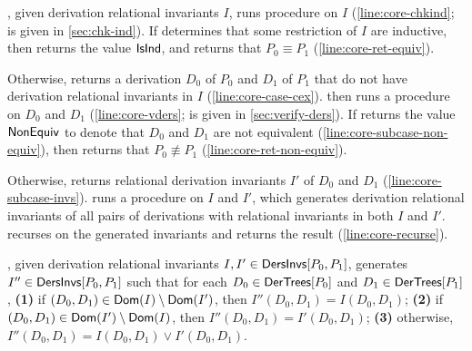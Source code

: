 \verifyaux, given derivation relational invariants $I$, runs procedure
\chkinductive on $I$ (\autoref{line:core-chkind}; 
%
\chkinductive is given in \autoref{sec:chk-ind}).
%
If \chkinductive determines that some restriction of $I$ are
inductive, then \chkinductive returns the value $\mathsf{IsInd}$, and
\verifyaux returns that $P_0 \equiv P_1$
(\autoref{line:core-ret-equiv}).

Otherwise, \chkinductive returns a derivation $D_0$ of $P_0$ and $D_1$
of $P_1$ that do not have derivation relational
invariants in $I$ (\autoref{line:core-case-cex}).
%
\verifyaux then runs a procedure \verifyders on $D_0$ and $D_1$
(\autoref{line:core-vders}; \verifyders is given in
\autoref{sec:verify-ders}).
%
If \verifyders returns the value $\mathsf{NonEquiv}$ to denote that $D_0$ and
$D_1$ are not equivalent (\autoref{line:core-subcase-non-equiv}), then
\verifyaux returns that $P_0 \not\equiv P_1$
(\autoref{line:core-ret-non-equiv}).

Otherwise, \verifyders returns relational derivation invariants $I'$
of $D_0$ and $D_1$ (\autoref{line:core-subcase-invs}).
%
\verifyaux runs a procedure \mergeinvs on $I$ and $I'$, which
generates derivation relational invariants of all pairs of derivations
with relational invariants in both $I$ and $I'$.
%
\verifyaux recurses on the generated invariants and returns the result
(\autoref{line:core-recurse}).

\mergeinvs, given derivation relational invariants $I, I' \in
\mathsf{DersInvs}[ P_0, P_1 ]$, generates $I'' \in \mathsf{DersInvs}[ P_0, P_1 ]$ such
that for each $D_0 \in \mathsf{DerTrees}[ P_0 ]$ and $D_1 \in \mathsf{DerTrees}[ P_1 ]$, %
\textbf{(1)} if $(D_0, D_1) \in \mathsf{Dom}(I) \setminus \mathsf{Dom}(I')$,
then $I''(D_0, D_1) = I(D_0, D_1)$;
%
\textbf{(2)} if $(D_0, D_1) \in \mathsf{Dom}(I') \setminus \mathsf{Dom}(I)$,
then $I''(D_0, D_1) = I'(D_0, D_1)$; %
\textbf{(3)} otherwise, $I''(D_0, D_1) = I(D_0, D_1) \lor I'(D_0,
D_1)$.

